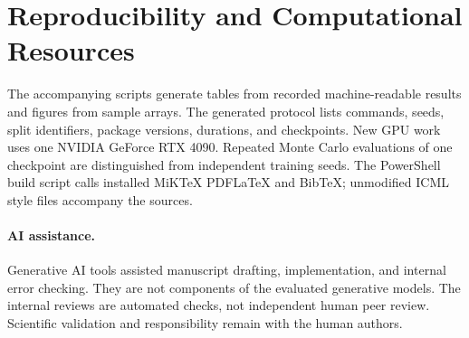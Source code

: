 \section{Reproducibility and Computational Resources}
\label{app:reproduce}
The accompanying scripts generate tables from recorded machine-readable results and figures from sample arrays. The generated protocol lists commands, seeds, split identifiers, package versions, durations, and checkpoints. New GPU work uses one NVIDIA GeForce RTX 4090. Repeated Monte Carlo evaluations of one checkpoint are distinguished from independent training seeds. The PowerShell build script calls installed MiKTeX PDFLaTeX and BibTeX; unmodified ICML style files accompany the sources.

\paragraph{AI assistance.}
Generative AI tools assisted manuscript drafting, implementation, and internal error checking. They are not components of the evaluated generative models. The internal reviews are automated checks, not independent human peer review. Scientific validation and responsibility remain with the human authors.
